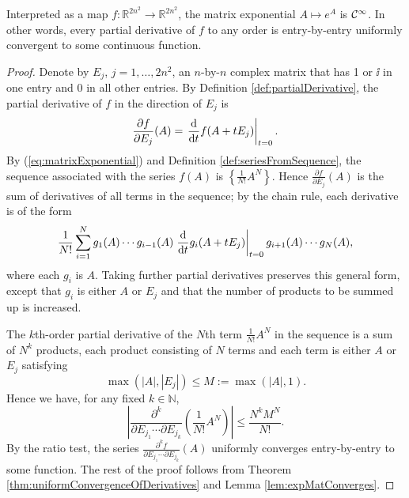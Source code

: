 \begin{thm}
  \label{thm:matExpSmooth}
  Interpreted as a map $f: \mathbb{R}^{2n^2}\rightarrow \mathbb{R}^{2n^2}$,
   the matrix exponential $A\mapsto e^A$ is ${\cal C}^{\infty}$.
  In other words,
   every partial derivative of $f$
   to any order is entry-by-entry uniformly convergent
   to some continuous function.
\end{thm}
\begin{proof}
  Denote by $E_j$, $j=1,\ldots,2n^2$, 
  an $n$-by-$n$ complex matrix that has 1 or $\ii$ in one entry
  and 0 in all other entries.
  By Definition \ref{def:partialDerivative},
  the partial derivative of $f$ in the direction of $E_j$
  is
  \begin{displaymath}
    \frac{\partial f}{\partial E_j}(A)
    = \left. \frac{\mathrm{d} }{\mathrm{d} t} f(A+tE_j)\right|_{t=0}.
  \end{displaymath}
  By (\ref{eq:matrixExponential}) and Definition \ref{def:seriesFromSequence},
  the sequence associated with the series $f(A)$ is
  $\left\{\frac{1}{N!}A^N\right\}$.
  Hence 
  $\frac{\partial f}{\partial E_j}(A)$ is the sum
  of derivatives of all terms in the sequence; 
  by the chain rule, 
  each derivative is of the form
  \begin{displaymath}
    \frac{1}{N!}\sum_{i=1}^N g_1(A)\cdots g_{i-1}(A)
    \left. \frac{\mathrm{d} }{\mathrm{d} t} g_i(A+tE_j)\right|_{t=0}
    g_{i+1}(A)\cdots g_N(A),
  \end{displaymath}
  where each $g_i$ is $A$. %
  Taking further partial derivatives preserves this general form,
  except that $g_i$ is either $A$ or $E_j$
  and that the number of products to be summed up is increased.
  
  The $k$th-order partial derivative of
  the $N$th term $\frac{1}{N!}A^N$ in the sequence
  is a sum of $N^k$ products,
  each product consisting of $N$ terms
  and each term is either $A$ or $E_j$
  satisfying
  \begin{displaymath}
    \max(|A|, |E_j|)\le M := \max(|A|,1).
  \end{displaymath}
  Hence we have, for any fixed $k\in \mathbb{N}$, 
  \begin{displaymath}
    \left|
      \frac{\partial^k }{\partial E_{j_1}\cdots \partial E_{j_k}}
      \left(\frac{1}{N!}A^N\right)
    \right|
    \le \frac{N^k M^N}{N!}.
  \end{displaymath}
  By the ratio test, 
  the series $\frac{\partial^k f}{\partial E_{j_1}\cdots
    \partial E_{j_k}}(A)$
  uniformly converges entry-by-entry to some function. 
  The rest of the proof follows from
  Theorem \ref{thm:uniformConvergenceOfDerivatives}
  and Lemma \ref{lem:expMatConverges}.
\end{proof}

